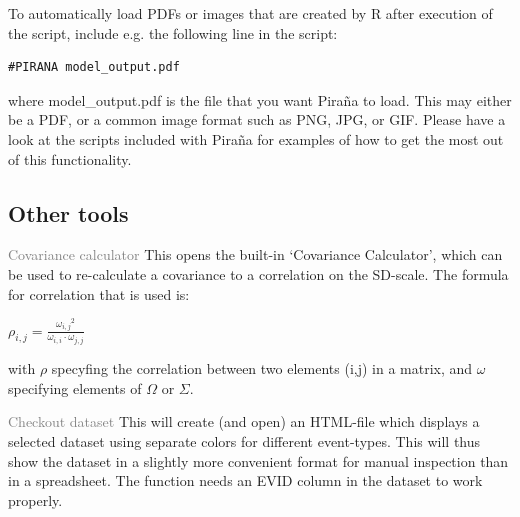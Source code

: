 \documentclass[a4,11pt]{report} \usepackage[pdftex]{graphicx}
\begin{document}
{\vspace{15pt} \noindent To automatically load PDFs or images that are created by
R after execution of the script, include e.g. the following line in
the script:

\begin{verbatim}
#PIRANA model_output.pdf
\end{verbatim}

\noindent where model\_output.pdf is the file that you want Pira\~na
to load. This may either be a PDF, or a common image format such as
PNG, JPG, or GIF. Please have a look at the scripts included with
Pira\~na for examples of how to get the most out of this
functionality.


\subsection{Other tools}

\begin {description}
  \item{\textcolor{Grey}{Covariance calculator}} This opens the
built-in `Covariance Calculator', which can be used to re-calculate a
covariance to a correlation on the SD-scale. The formula for
correlation that is used is:

\vspace{10pt}
$ \rho_{i,j} = \frac{{\omega_{i,j}}^2 }{\omega_{i,i} \cdot \omega_{j,j} }
$
\vspace{10pt}

with $\rho$ specyfing the correlation between two elements (i,j) in a
matrix, and $\omega$ specifying elements of $\Omega$ or $\Sigma$.

  \item{\textcolor{Grey}{Checkout dataset}} This will create (and open)
an HTML-file which displays a selected dataset using separate colors for
different event-types. This will thus show the dataset in a slightly more
convenient format for manual inspection than in a spreadsheet. The
function needs an EVID column in the dataset to work properly.
\end{description}

}
\end{document}
